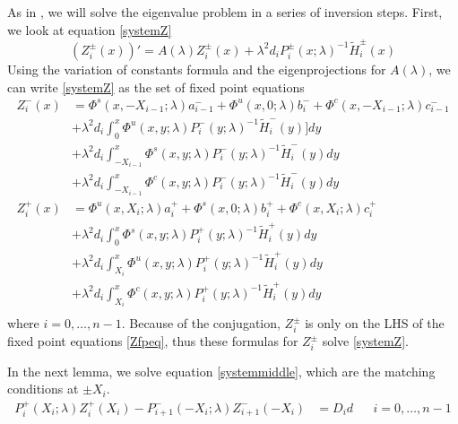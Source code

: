 \documentclass[thesis.tex]{subfiles}
\begin{document}
As in \cite{Sandstede1998}, we will solve the eigenvalue problem in a series of inversion steps. First, we look at equation \eqref{systemZ}
\[
(Z_i^\pm(x))' = A(\lambda) Z_i^\pm(x) + \lambda^2 d_i P_i^\pm(x; \lambda)^{-1} \tilde{H}_i^\pm(x) 
\]
Using the variation of constants formula and the eigenprojections for $A(\lambda)$, we can write \eqref{systemZ} as the set of fixed point equations
\begin{equation}\label{Zfpeq}
\begin{aligned}
Z_i^-(x) &= \Phi^s(x, -X_{i-1}; \lambda) a_{i-1}^- + \Phi^u(x, 0; \lambda) b_i^- + \Phi^c(x, -X_{i-1}; \lambda) c_{i-1}^- \\
&+ \lambda^2 d_i \int_0^x \Phi^u(x, y; \lambda) P_i^-(y; \lambda)^{-1} \tilde{H}_i^-(y)] dy \\
&+ \lambda^2 d_i \int_{-X_{i-1}}^x \Phi^s(x, y; \lambda) P_i^-(y; \lambda)^{-1} \tilde{H}_i^-(y) dy \\
&+ \lambda^2 d_i \int_{-X_{i-1}}^x \Phi^c(x, y; \lambda) P_i^-(y; \lambda)^{-1} \tilde{H}_i^-(y) dy  \\ 
Z_i^+(x) &= \Phi^u(x, X_i; \lambda) a_i^+ + \Phi^s(x, 0; \lambda) b_i^+ + \Phi^c(x, X_i; \lambda) c_i^+ \\
&+ \lambda^2 d_i \int_0^x \Phi^s(x, y; \lambda) P_i^+(y; \lambda)^{-1} \tilde{H}_i^+(y) dy \\
&+ \lambda^2 d_i \int_{X_i}^x \Phi^u(x, y; \lambda) P_i^+(y; \lambda)^{-1} \tilde{H}_i^+(y) dy \\
&+ \lambda^2 d_i \int_{X_i}^x \Phi^c(x, y; \lambda) P_i^+(y; \lambda)^{-1} \tilde{H}_i^+(y) dy \\
\end{aligned}
\end{equation}
where $i = 0, \dots, n-1$. Because of the conjugation, $Z_i^\pm$ is only on the LHS of the fixed point equations \eqref{Zfpeq}, thus these formulas for $Z_i^\pm$ solve \eqref{systemZ}.

In the next lemma, we solve equation \eqref{systemmiddle}, which are the matching conditions at $\pm X_i$.
\begin{align*}
P_i^+(X_i; \lambda) Z_i^+(X_i) - P_{i+1}^-(-X_i; \lambda) Z_{i+1}^-(-X_i) &= D_i d && i = 0, \dots, n-1
\end{align*}
\end{document}
